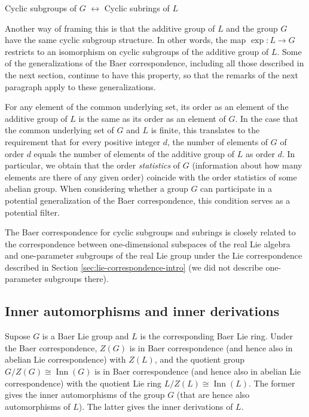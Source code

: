 \begin{center}
  Cyclic subgroups of $G$ $\leftrightarrow$ Cyclic subrings of $L$
\end{center}

Another way of framing this is that the additive group of $L$ and the
group $G$ have the same cyclic subgroup structure. In other words, the
map $\exp: L \to G$ restricts to an isomorphism on cyclic subgroups of
the additive group of $L$. Some of the generalizations of the Baer
correspondence, including all those described in the next section,
continue to have this property, so that the remarks of the next
paragraph apply to these generalizations.

For any element of the common underlying set, its order as an element
of the additive group of $L$ is the same as its order as an element of
$G$. In the case that the common underlying set of $G$ and $L$ is
finite, this translates to the requirement that for every positive
integer $d$, the number of elements of $G$ of order $d$ equals the
number of elements of the additive group of $L$ as order $d$. In
particular, we obtain that the order {\em statistics} of $G$
(information about how many elements are there of any given order)
coincide with the order statistics of some abelian group. When
considering whether a group $G$ can participate in a potential
generalization of the Baer correspondence, this condition serves as a
potential filter.

The Baer correspondence for cyclic subgroups and subrings is closely
related to the correspondence between one-dimensional subspaces of the
real Lie algebra and one-parameter subgroups of the real Lie group
under the Lie correspondence described in Section
\ref{sec:lie-correspondence-intro} (we did not describe one-parameter
subgroups there).

\subsection{Inner automorphisms and inner derivations}\label{sec:baer-adjoint}

Supose $G$ is a Baer Lie group and $L$ is the corresponding Baer Lie
ring. Under the Baer correspondence, $Z(G)$ is in Baer correspondence
(and hence also in abelian Lie correspondence) with $Z(L)$, and the
quotient group $G/Z(G) \cong \operatorname{Inn}(G)$ is in Baer
correspondence (and hence also in abelian Lie correspondence) with the
quotient Lie ring $L/Z(L) \cong \operatorname{Inn}(L)$. The former
gives the inner automorphisms of the group $G$ (that are hence also
automorphisms of $L$). The latter gives the inner derivations of $L$.

